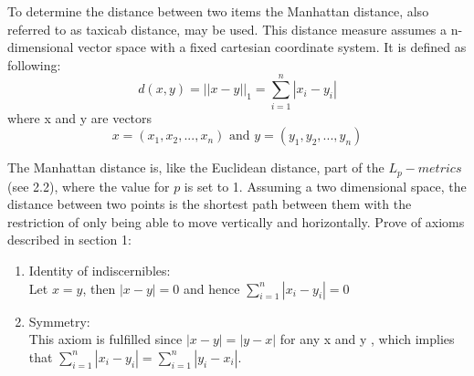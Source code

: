 To determine the distance between two items the Manhattan distance, also referred to as taxicab distance, may be used. This distance measure assumes a n-dimensional vector space with a fixed cartesian coordinate system. It is defined as following:
$$d(x,y)= ||x-y||_1 = \sum\limits_{i=1}^{n}|x_i - y_i|$$
where x and y are vectors
$$x = (x_1, x_2,..., x_n) \text{ and } y = (y_1, y_2,..., y_n)$$

The Manhattan distance is, like the Euclidean distance, part of the $L_p-metrics$ (see 2.2), where the value for $p$ is set to 1.
Assuming a two dimensional space, the distance between two points is the shortest path between them with the restriction of only being able to move vertically and horizontally.
Prove of axioms described in section 1:\\
\begin{enumerate}
	\item Identity of indiscernibles:\\
	Let $x=y$, then $|x-y| = 0$ and hence $\sum\limits_{i=1}^{n}|x_i - y_i| = 0$
	\item Symmetry:\\
	This axiom is fulfilled since $|x-y| = |y-x|$ for any x and y , which implies that $\sum\limits_{i=1}^{n}|x_i - y_i| = \sum\limits_{i=1}^{n}|y_i - x_i|$.
\end{enumerate}